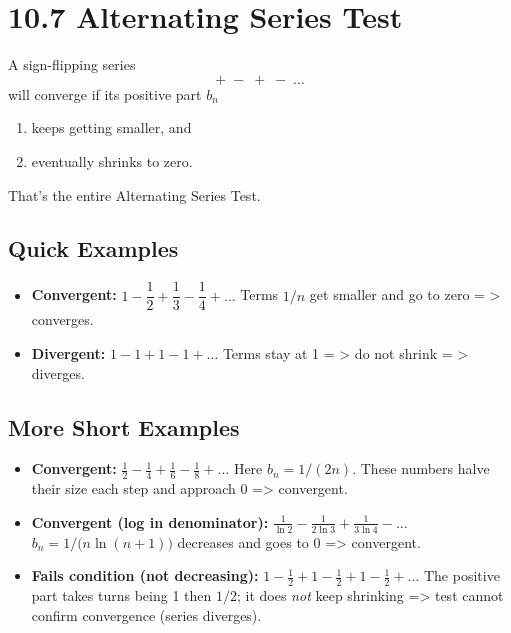 \documentclass{article}
\begin{document}
\newpage
\section{10.7 Alternating Series Test}

\begin{tcolorbox}[colback=gray!8,colframe=black,title=Big-Idea (plain words)]
A sign-flipping series
\[
+\;-\;+\;-\;\dots
\]
will converge if its positive part \(b_n\)

\begin{enumerate}[itemsep=2pt]
  \item keeps getting smaller, and
  \item eventually shrinks to zero.
\end{enumerate}
That’s the entire Alternating Series Test.
\end{tcolorbox}

\subsection*{Quick Examples}

\begin{itemize}[itemsep=10pt]

  \item \textbf{Convergent:}\; \(1 - \dfrac12 + \dfrac13 - \dfrac14 + \dots\)
        Terms \(1/n\) get smaller and go to zero = > converges.

  \item \textbf{Divergent:}\; \(1 - 1 + 1 - 1 + \dots\)
        Terms stay at 1 = > do not shrink  = > diverges.

\end{itemize}

\subsection*{More Short Examples}

\begin{itemize}[itemsep=10pt]

  \item \textbf{Convergent:}\;
        \(\displaystyle \frac{1}{2} - \frac{1}{4} + \frac{1}{6} - \frac{1}{8} + \dots\)
        Here \(b_n = 1/(2n)\).  These numbers halve their size each step and
        approach 0 => convergent.

  \item \textbf{Convergent (log in denominator):}\;
        \(\displaystyle \frac{1}{\ln 2} - \frac{1}{2\ln 3} + \frac{1}{3\ln 4} - \dots\)
        \(b_n = 1\!\big/\!\bigl(n\ln(n+1)\bigr)\) decreases and goes to 0 => convergent.

  \item \textbf{Fails condition (not decreasing):}\;
        \(\displaystyle 1 - \frac{1}{2} + 1 - \frac{1}{2} + 1 - \frac{1}{2} + \dots\)
        The positive part takes turns being 1 then \(1/2\); it does \emph{not}
        keep shrinking => test cannot confirm convergence (series diverges).

\end{itemize}
\end{document}
